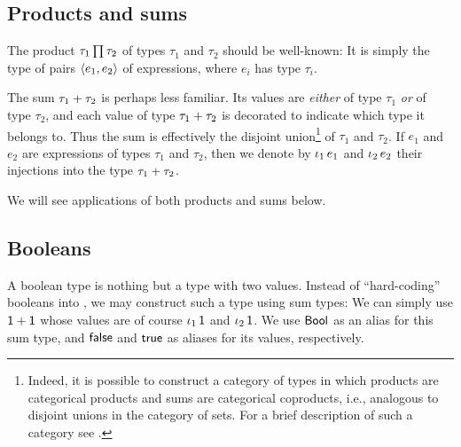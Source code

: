\subsection{Products and sums}

The product $\typeProd{\tau_1}{\tau_2}$ of types $\tau_1$ and $\tau_2$ should be well-known: It is simply the type of pairs $\langle\textcolor{black}{e_1},\textcolor{black}{e_2}\rangle$ of expressions, where $e_i$ has type $\tau_i$.

The sum $\textcolor{black}{\tau_1} + \textcolor{black}{\tau_2}$ is perhaps less familiar. Its values are \emph{either} of type $\tau_1$ \emph{or} of type $\tau_2$, and each value of type $\textcolor{black}{\tau_1} + \textcolor{black}{\tau_2}$ is decorated to indicate which type it belongs to. Thus the sum is effectively the disjoint union\footnote{Indeed, it is possible to construct a category of types in which products are categorical products and sums are categorical coproducts, i.e., analogous to disjoint unions in the category of sets. For a brief description of such a category see \textcite[§2.5]{awodey-category-theory}.} of $\tau_1$ and $\tau_2$. If $e_1$ and $e_2$ are expressions of types $\tau_1$ and $\tau_2$, then we denote by $\expInjl{e_1}$ and $\expInjr{e_2}$ their injections into the type $\textcolor{black}{\tau_1} + \textcolor{black}{\tau_2}$.

We will see applications of both products and sums below.


\subsection{Booleans}\label{sec:booleans}

A boolean type is nothing but a type with two values. Instead of \enquote{hard-coding} booleans into \langrecref{}, we may construct such a type using sum types: We can simply use $\textcolor{black}{\mathsf{1}} + \textcolor{black}{\mathsf{1}}$ whose values are of course $\expInjl{\expUnit}$ and $\expInjr{\expUnit}$. We use $\mathsf{Bool}$ as an alias for this sum type, and $\mathsf{false}$ and $\mathsf{true}$ as aliases for its values, respectively.

